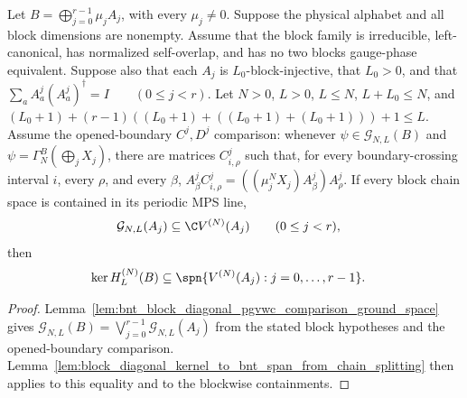 \begin{lemma}
    \label{lem:block_diagonal_kernel_to_bnt_span_from_pgvwc_comparison}
    \leanok
    Let $B=\bigoplus_{j=0}^{r-1}\mu_jA_j$, with every $\mu_j\ne0$.
    Suppose the physical alphabet and all block dimensions are nonempty. Assume
    that the block family is irreducible, left-canonical, has normalized
    self-overlap, and has no two blocks gauge-phase equivalent. Suppose also
    that each $A_j$ is $L_0$-block-injective, that $L_0>0$, and that
    $\sum_a A^j_a(A^j_a)^\dagger =I \qquad (0\le j<r)$.
    Let $N>0$, $L>0$, $L\le N$, $L+L_0\le N$, and
    $(L_0+1) +(r-1)((L_0+1)+((L_0+1)+(L_0+1)))+1 \le L$.
    Assume the opened-boundary $C^j,D^j$ comparison: whenever
    $\psi\in\mathcal G_{N,L}(B)$ and
    $\psi=\Gamma_N^B(\bigoplus_j X_j)$, there are matrices
    $C^j_{i,\rho}$ such that, for every boundary-crossing interval $i$,
    every $\rho$, and every $\beta$,
    $A^j_\beta C^j_{i,\rho} =((\mu_j^N X_j)A^j_\beta)A^j_\rho$.
    If every block chain space is contained in its periodic MPS line,
    \begin{align}
        \mathcal G_{N,L}(A_j)
         & \subseteq \C V^{(N)}(A_j)
        \qquad (0\le j<r), \notag
    \end{align}
    then
    \begin{align}
        \ker H_L^{(N)}(B)
         & \subseteq
        \spn\{V^{(N)}(A_j):j=0,\ldots,r-1\}. \notag
    \end{align}
\end{lemma}

\begin{proof}
    \leanok
    Lemma~\ref{lem:bnt_block_diagonal_pgvwc_comparison_ground_space} gives
    $\mathcal G_{N,L}(B) =\bigvee_{j=0}^{r-1}\mathcal G_{N,L}(A_j)$
    from the stated block hypotheses and the opened-boundary comparison.
    Lemma~\ref{lem:block_diagonal_kernel_to_bnt_span_from_chain_splitting}
    then applies to this equality and to the blockwise containments.
\end{proof}

